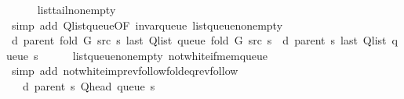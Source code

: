 \begin{isabellebody}
\ \ \ \ \isamarkupfalse%
\ list{\isacharunderscore}{\kern0pt}tail{\isacharunderscore}{\kern0pt}non{\isacharunderscore}{\kern0pt}empty\isanewline
\ \ \ \ \isamarkupfalse%
\ {\isacharparenleft}{\kern0pt}simp\ add{\isacharcolon}{\kern0pt}\ Q{\isachardot}{\kern0pt}list{\isacharunderscore}{\kern0pt}queue{\isacharbrackleft}{\kern0pt}OF\ invar{\isacharunderscore}{\kern0pt}queue\ list{\isacharunderscore}{\kern0pt}queue{\isacharunderscore}{\kern0pt}non{\isacharunderscore}{\kern0pt}empty{\isacharbrackright}{\kern0pt}{\isacharparenright}{\kern0pt}\isanewline
\ \ \isamarkupfalse%
\ {\isachardoublequoteopen}d\ {\isacharparenleft}{\kern0pt}parent\ {\isacharparenleft}{\kern0pt}fold\ G\ src\ s{\isacharparenright}{\kern0pt}{\isacharparenright}{\kern0pt}\ {\isacharparenleft}{\kern0pt}last\ {\isacharparenleft}{\kern0pt}Q{\isacharunderscore}{\kern0pt}list\ {\isacharparenleft}{\kern0pt}queue\ {\isacharparenleft}{\kern0pt}fold\ G\ src\ s{\isacharparenright}{\kern0pt}{\isacharparenright}{\kern0pt}{\isacharparenright}{\kern0pt}{\isacharparenright}{\kern0pt}\ {\isacharequal}{\kern0pt}\ d\ {\isacharparenleft}{\kern0pt}parent\ s{\isacharparenright}{\kern0pt}\ {\isacharparenleft}{\kern0pt}last\ {\isacharparenleft}{\kern0pt}Q{\isacharunderscore}{\kern0pt}list\ {\isacharparenleft}{\kern0pt}queue\ s{\isacharparenright}{\kern0pt}{\isacharparenright}{\kern0pt}{\isacharparenright}{\kern0pt}{\isachardoublequoteclose}\isanewline
\ \ \ \ \isamarkupfalse%
\ list{\isacharunderscore}{\kern0pt}queue{\isacharunderscore}{\kern0pt}non{\isacharunderscore}{\kern0pt}empty\ not{\isacharunderscore}{\kern0pt}white{\isacharunderscore}{\kern0pt}if{\isacharunderscore}{\kern0pt}mem{\isacharunderscore}{\kern0pt}queue\isanewline
\ \ \ \ \isamarkupfalse%
\ {\isacharparenleft}{\kern0pt}simp\ add{\isacharcolon}{\kern0pt}\ not{\isacharunderscore}{\kern0pt}white{\isacharunderscore}{\kern0pt}imp{\isacharunderscore}{\kern0pt}rev{\isacharunderscore}{\kern0pt}follow{\isacharunderscore}{\kern0pt}fold{\isacharunderscore}{\kern0pt}eq{\isacharunderscore}{\kern0pt}rev{\isacharunderscore}{\kern0pt}follow{\isacharparenright}{\kern0pt}\isanewline
\ \ \isamarkupfalse%
\ \isamarkupfalse%
\ {\isachardoublequoteopen}{\isachardot}{\kern0pt}{\isachardot}{\kern0pt}{\isachardot}{\kern0pt}\ {\isasymle}\ d\ {\isacharparenleft}{\kern0pt}parent\ s{\isacharparenright}{\kern0pt}\ {\isacharparenleft}{\kern0pt}Q{\isacharunderscore}{\kern0pt}head\ {\isacharparenleft}{\kern0pt}queue\ s{\isacharparenright}{\kern0pt}{\isacharparenright}{\kern0pt}\ {\isacharplus}{\kern0pt}\ {}{\isachardoublequoteclose}\isanewline

\end{isabellebody}
